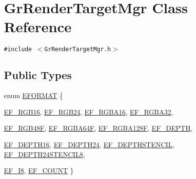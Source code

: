 \hypertarget{class_gr_render_target_mgr}{
\section{GrRenderTargetMgr Class Reference}
\label{class_gr_render_target_mgr}
}
{\tt \#include $<$GrRenderTargetMgr.h$>$}

\subsection*{Public Types}
\begin{CompactItemize}
\item 
enum \hyperlink{class_gr_render_target_mgr_66d0ebb49e9781283d824f19f4bbc3f6}{EFORMAT} \{ \par
\hyperlink{class_gr_render_target_mgr_66d0ebb49e9781283d824f19f4bbc3f68ade5e72370dc585b375a3e2cb3f7a9d}{EF\_\-RGB16}, 
\hyperlink{class_gr_render_target_mgr_66d0ebb49e9781283d824f19f4bbc3f6d76299796d20b7aab4ed935b86f13271}{EF\_\-RGB24}, 
\hyperlink{class_gr_render_target_mgr_66d0ebb49e9781283d824f19f4bbc3f6cc436697fc2b0b9abaaf6195a0fc3727}{EF\_\-RGBA16}, 
\hyperlink{class_gr_render_target_mgr_66d0ebb49e9781283d824f19f4bbc3f68daf6d100b1c33a7c1cbb6851e64dd2b}{EF\_\-RGBA32}, 
\par
\hyperlink{class_gr_render_target_mgr_66d0ebb49e9781283d824f19f4bbc3f6ff4dc1c94c5f78c2a857a8a3860116ba}{EF\_\-RGB48F}, 
\hyperlink{class_gr_render_target_mgr_66d0ebb49e9781283d824f19f4bbc3f67337caa429671548b8dfeaaf770a90e7}{EF\_\-RGBA64F}, 
\hyperlink{class_gr_render_target_mgr_66d0ebb49e9781283d824f19f4bbc3f68bf48fc5dd1d228a758325704bd134bf}{EF\_\-RGBA128F}, 
\hyperlink{class_gr_render_target_mgr_66d0ebb49e9781283d824f19f4bbc3f6921d4c2f8d32dd605d25dee31fc2312d}{EF\_\-DEPTH}, 
\par
\hyperlink{class_gr_render_target_mgr_66d0ebb49e9781283d824f19f4bbc3f6d6aefc75876632a9133c89c34a2d1d23}{EF\_\-DEPTH16}, 
\hyperlink{class_gr_render_target_mgr_66d0ebb49e9781283d824f19f4bbc3f6cc8c9a53d5f3055fc0f60c31c21c673a}{EF\_\-DEPTH24}, 
\hyperlink{class_gr_render_target_mgr_66d0ebb49e9781283d824f19f4bbc3f6441f5aba0d3c4c3996be32c216da5680}{EF\_\-DEPTHSTENCIL}, 
\hyperlink{class_gr_render_target_mgr_66d0ebb49e9781283d824f19f4bbc3f60610a6f54a0ca8c92a758f9779453d49}{EF\_\-DEPTH24STENCIL8}, 
\par
\hyperlink{class_gr_render_target_mgr_66d0ebb49e9781283d824f19f4bbc3f67d4b0685ab48716d2321ec7258971218}{EF\_\-I8}, 
\hyperlink{class_gr_render_target_mgr_66d0ebb49e9781283d824f19f4bbc3f6c09969222a376e76623f4c8900470227}{EF\_\-COUNT}
 \}

\end{CompactItemize}
